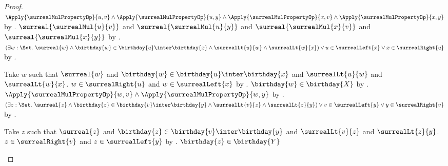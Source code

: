 \begin{proof}
    $\Apply{\surrealMulPropertyOp}{u,v}
        \land\Apply{\surrealMulPropertyOp}{u,y}
        \land\Apply{\surrealMulPropertyOp}{x,v}
        \land\Apply{\surrealMulPropertyOp}{x,y}$
        by .
    $\surreal{\surrealMul{u}{v}}$ and
        $\surreal{\surrealMul{u}{y}}$ and
        $\surreal{\surrealMul{x}{v}}$ and
        $\surreal{\surrealMul{x}{y}}$
        by .
    $(\exists w:\Set.\ \surreal{w}\land
            \birthday{w}\in\birthday{u}\inter\birthday{x}\land
            \surrealLt{u}{w}\land\surrealLt{w}{x})
        \lor u\in\surrealLeft{x}
        \lor x\in\surrealRight{u}$
        by .
    \begin{byCase}
            Take $w$ such that $\surreal{w}$ and
                $\birthday{w}\in\birthday{u}\inter\birthday{x}$ and
                $\surrealLt{u}{w}$ and $\surrealLt{w}{x}$.
            $w\in\surrealRight{u}$ and $w\in\surrealLeft{x}$
                by .
            $\birthday{w}\in\birthday{X}$
                by
                .
            $\Apply{\surrealMulPropertyOp}{w,v}
                \land\Apply{\surrealMulPropertyOp}{w,y}$
                by .
            $(\exists z:\Set.\ \surreal{z}\land
                    \birthday{z}\in\birthday{v}\inter\birthday{y}\land
                    \surrealLt{v}{z}\land\surrealLt{z}{y})
                \lor v\in\surrealLeft{y}
                \lor y\in\surrealRight{v}$
                by .
            \begin{byCase}
                    Take $z$ such that $\surreal{z}$ and
                        $\birthday{z}\in
                            \birthday{v}\inter\birthday{y}$ and
                        $\surrealLt{v}{z}$ and $\surrealLt{z}{y}$.
                    $z\in\surrealRight{v}$ and $z\in\surrealLeft{y}$
                        by
                        .
                    $\birthday{z}\in\birthday{Y}$

\end{byCase}
\end{byCase}
\end{proof}
